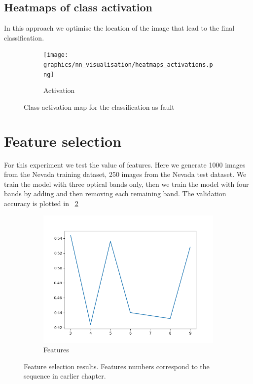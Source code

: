 \documentclass[11pt,a4paper]{article}
\begin{document}
\subsection{Heatmaps of class activation}
In this approach we optimise the location of the image that lead to the final classification.
\begin{figure}[t]
    \centering
    \begin{subfigure}[b]{0.3\textwidth}
        \texttt{[image: graphics/nn\_visualisation/heatmaps\_activations.png]}
        \caption{Activation}
    \end{subfigure}

    \caption{Class activation map for the classification as fault}
    \label{fig:nn_vis_conv_filters}
\end{figure}

\section{Feature selection}
For this experiment we test the value of features. Here we generate 1000 images from the Nevada training dataset, 250
images from the Nevada test dataset. We train the model with three optical bands only, then we train the model with
four bands by adding and then removing each remaining band. The validation accuracy is plotted in \figurename~\ref{fig:feature_selection}

\begin{figure}[t]
    \centering
    \begin{subfigure}[b]{0.3\textwidth}
        \includegraphics[width=\textwidth]{graphics/feature_selection.png}
        \caption{Features}
    \end{subfigure}

    \caption{Feature selection results. Features numbers correspond to the sequence in earlier chapter.}
    \label{fig:feature_selection}
\end{figure}
\end{document}
